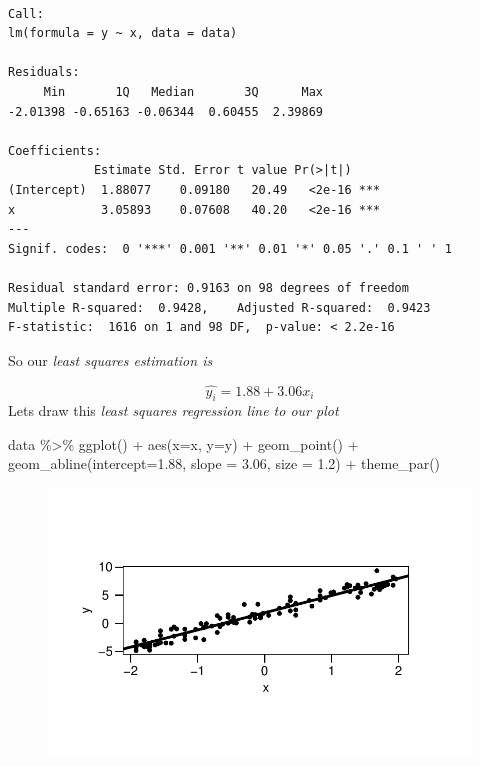 \documentclass[
  letterpaper,
  DIV=11,
  numbers=noendperiod]{scrreprt}
\newenvironment{Shaded}{\begin{snugshade}}{\end{snugshade}}
\newcommand{\AttributeTok}[1]{\textcolor[rgb]{0.65,0.35,0.00}{#1}}
\newcommand{\FloatTok}[1]{\textcolor[rgb]{0.65,0.35,0.00}{#1}}
\newcommand{\FunctionTok}[1]{\textcolor[rgb]{0.02,0.16,0.49}{#1}}
\newcommand{\NormalTok}[1]{\textcolor[rgb]{0.33,0.33,0.33}{#1}}
\newcommand{\SpecialCharTok}[1]{\textcolor[rgb]{0.00,0.46,0.62}{#1}}
\begin{document}
\begin{verbatim}

Call:
lm(formula = y ~ x, data = data)

Residuals:
     Min       1Q   Median       3Q      Max 
-2.01398 -0.65163 -0.06344  0.60455  2.39869 

Coefficients:
            Estimate Std. Error t value Pr(>|t|)    
(Intercept)  1.88077    0.09180   20.49   <2e-16 ***
x            3.05893    0.07608   40.20   <2e-16 ***
---
Signif. codes:  0 '***' 0.001 '**' 0.01 '*' 0.05 '.' 0.1 ' ' 1

Residual standard error: 0.9163 on 98 degrees of freedom
Multiple R-squared:  0.9428,    Adjusted R-squared:  0.9423 
F-statistic:  1616 on 1 and 98 DF,  p-value: < 2.2e-16
\end{verbatim}

So our \emph{least squares estimation is}

\[
\hat{y_i} = 1.88 + 3.06 x_i
\] Lets draw this \emph{least squares regression line to our plot}

\begin{Shaded}
\begin{Highlighting}[]
\NormalTok{data }\SpecialCharTok{\%\textgreater{}\%} 
  \FunctionTok{ggplot}\NormalTok{() }\SpecialCharTok{+} \FunctionTok{aes}\NormalTok{(}\AttributeTok{x=}\NormalTok{x, }\AttributeTok{y=}\NormalTok{y) }\SpecialCharTok{+} \FunctionTok{geom\_point}\NormalTok{() }\SpecialCharTok{+} \FunctionTok{geom\_abline}\NormalTok{(}\AttributeTok{intercept=}\FloatTok{1.88}\NormalTok{, }\AttributeTok{slope =} \FloatTok{3.06}\NormalTok{, }\AttributeTok{size =} \FloatTok{1.2}\NormalTok{) }\SpecialCharTok{+} \FunctionTok{theme\_par}\NormalTok{()}
\end{Highlighting}
\end{Shaded}

\begin{figure}[H]

{\centering \includegraphics{Chapter3_files/figure-pdf/unnamed-chunk-15-1.pdf}

}

\end{figure}
\end{document}
